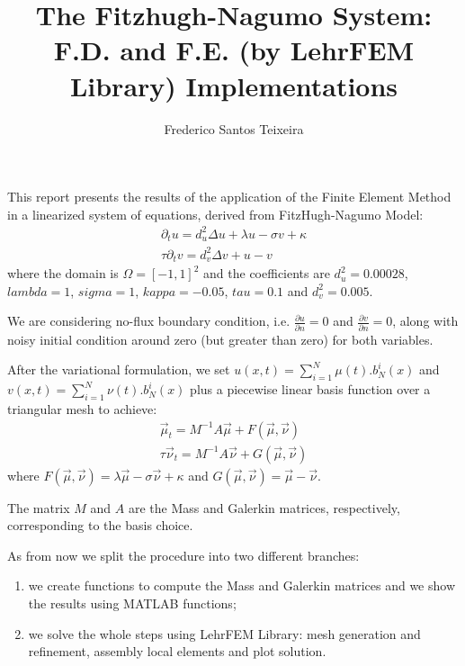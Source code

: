 \documentclass[a4paper]{article}
\title{The Fitzhugh-Nagumo System: F.D. and F.E. (by LehrFEM Library) Implementations}
\author{Frederico Santos Teixeira}
\begin{document}
\maketitle

This report presents the results of the application of the Finite Element Method in a linearized system of equations, derived from FitzHugh-Nagumo Model:
\begin{gather*}
	\partial_t u = d_u^2 \Delta u + \lambda u - \sigma v + \kappa
	\\
	\tau \partial_t v = d_v^2 \Delta v + u - v
\end{gather*}
where the domain is $ \Omega = [-1, 1]^2 $ and the coefficients are $ d_u^2 = 0.00028 $, $ lambda = 1 $, $ sigma = 1 $, $ kappa = -0.05 $, $ tau = 0.1 $ and $ d_v^2 = 0.005 $.

We are considering no-flux boundary condition, i.e. $ \frac{\partial u}{\partial n} = 0 $ and $ \frac{\partial v}{\partial n} = 0  $, along with noisy initial condition around zero (but greater than zero) for both variables.

After the variational formulation, we set $ u(x,t) = \sum_{i=1}^{N} \mu (t) . b_N^i (x) $ and  $ v(x,t) = \sum_{i=1}^{N} \nu(t) . b_N^i(x) $ plus a piecewise linear basis function over a triangular mesh to achieve:
\begin{gather*}
\overrightarrow{\mu}_t = M^{-1} A \overrightarrow{\mu} + F(\overrightarrow{\mu}, \overrightarrow{\nu})
\\
\tau \overrightarrow{\nu}_t = M^{-1} A \overrightarrow{\nu} + G(\overrightarrow{\mu}, \overrightarrow{\nu})
\end{gather*}
where $ F(\overrightarrow{\mu}, \overrightarrow{\nu}) = \lambda \overrightarrow{\mu} - \sigma \overrightarrow{\nu} + \kappa $ and $ G(\overrightarrow{\mu}, \overrightarrow{\nu}) = \overrightarrow{\mu} - \overrightarrow{\nu} $. 

The matrix $ M $ and $ A $ are the Mass and Galerkin matrices, respectively, corresponding to the basis choice.

As from now we split the procedure into two different branches: 
\begin{enumerate}
\item we create functions to compute the Mass and Galerkin matrices and we show the results using MATLAB functions;
\item we solve the whole steps using LehrFEM Library: mesh generation and refinement, assembly local elements and plot solution.
\end{enumerate}
\end{document}
